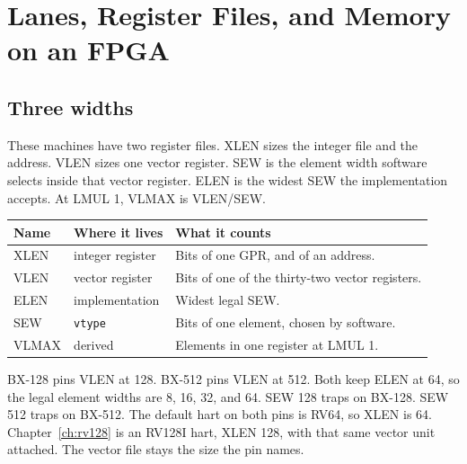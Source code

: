 \chapter{Lanes, Register Files, and Memory on an FPGA}
\label{ch:fpga}

\section{Three widths}

These machines have two register files. XLEN sizes the integer file and the address. VLEN sizes one vector register. SEW is the element width software selects inside that vector register. ELEN is the widest SEW the implementation accepts. At LMUL 1, VLMAX is VLEN/SEW.

\begin{center}
\begin{tabular}{@{}llp{6.4cm}@{}}
\toprule
Name & Where it lives & What it counts \\
\midrule
XLEN & integer register & Bits of one GPR, and of an address. \\
VLEN & vector register & Bits of one of the thirty-two vector registers. \\
ELEN & implementation & Widest legal SEW. \\
SEW & \texttt{vtype} & Bits of one element, chosen by software. \\
VLMAX & derived & Elements in one register at LMUL 1. \\
\bottomrule
\end{tabular}
\end{center}

BX-128 pins VLEN at 128. BX-512 pins VLEN at 512. Both keep ELEN at 64, so the legal element widths are 8, 16, 32, and 64. SEW 128 traps on BX-128. SEW 512 traps on BX-512. The default hart on both pins is RV64, so XLEN is 64. Chapter~\ref{ch:rv128} is an RV128I hart, XLEN 128, with that same vector unit attached. The vector file stays the size the pin names.

